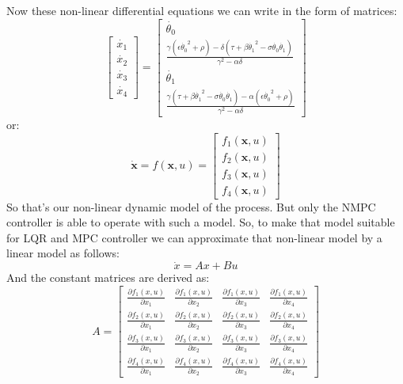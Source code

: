Now these non-linear differential equations we can write in the form of matrices:
\begin{equation}\label{nonlinmodel}
\begin{bmatrix}
\dot{x_1} \\ \dot{x_2} \\ \dot{x_3} \\ \dot{x_4}
\end{bmatrix} = \begin{bmatrix}
\dot{\theta_0}\\
\frac{\gamma(\epsilon\dot{\theta_0}^2+\rho)-\delta(\tau+\beta\dot{\theta_1}^2-\sigma\dot{\theta_0}\dot{\theta_1})}{\gamma^2-\alpha\delta}\\
\dot{\theta_1}\\
 \frac{\gamma(\tau+\beta\dot{\theta_1}^2-\sigma\dot{\theta_0}\dot{\theta_1})-\alpha(\epsilon\dot{\theta_0}^2+\rho)}{\gamma^2-\alpha\delta}
\end{bmatrix}
\end{equation}
or:
\begin{equation}\dot{\textbf{x}} = f(\textbf{x},u) =\begin{bmatrix}f_1(\textbf{x},u)\\f_2(\textbf{x},u)\\f_3(\textbf{x},u)\\f_4(\textbf{x},u)\end{bmatrix} \end{equation}
So that’s our non-linear dynamic model of the process. But only the NMPC controller is able to operate with such a model.  So, to make that model suitable for LQR and MPC controller we can approximate that non-linear model by a linear model as follows:
\begin{equation}\dot{x} = Ax + Bu\end{equation}
And the constant matrices are derived as:
\begin{equation}
A = \begin{bmatrix}
\frac{\partial f_1(x,u)}{\partial x_1}&\frac{\partial f_1(x,u)}{\partial x_2}&\frac{\partial f_1(x,u)}{\partial x_3}&\frac{\partial f_1(x,u)}{\partial x_4}\\
\frac{\partial f_2(x,u)}{\partial x_1}&\frac{\partial f_2(x,u)}{\partial x_2}&\frac{\partial f_2(x,u)}{\partial x_3}&\frac{\partial f_2(x,u)}{\partial x_4}\\
\frac{\partial f_3(x,u)}{\partial x_1}&\frac{\partial f_3(x,u)}{\partial x_2}&\frac{\partial f_3(x,u)}{\partial x_3}&\frac{\partial f_3(x,u)}{\partial x_4}\\
\frac{\partial f_4(x,u)}{\partial x_1}&\frac{\partial f_4(x,u)}{\partial x_2}&\frac{\partial f_4(x,u)}{\partial x_3}&\frac{\partial f_4(x,u)}{\partial x_4}
\end{bmatrix}
\end{equation}
